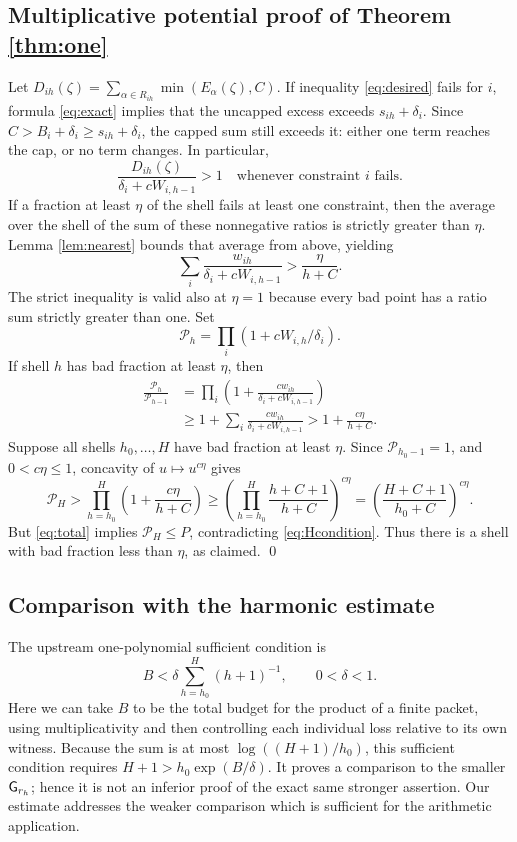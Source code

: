 \documentclass[11pt]{article}
\theoremstyle{remark}\newtheorem{remark}[theorem]{Remark}
\begin{document}
\subsection{Multiplicative potential proof of Theorem \ref{thm:one}}
Let $D_{ih}(\zeta)=\sum_{\alpha\in R_{ih}}\min(E_\alpha(\zeta),C)$.
If inequality \eqref{eq:desired} fails for $i$, formula \eqref{eq:exact}
implies that the uncapped excess exceeds $s_{ih}+\delta_i$. Since
$C>B_i+\delta_i\ge s_{ih}+\delta_i$, the capped sum still exceeds it:
either one term reaches the cap, or no term changes. In particular,
\[
 \frac{D_{ih}(\zeta)}{\delta_i+cW_{i,h-1}}>1
 \quad\text{whenever constraint $i$ fails.}
\]
If a fraction at least $\eta$ of the shell fails at least one constraint,
then the average over the shell of the sum of these nonnegative ratios
is strictly greater than $\eta$. Lemma \ref{lem:nearest} bounds that
average from above, yielding
\begin{equation}\label{eq:bad}
 \sum_i\frac{w_{ih}}{\delta_i+cW_{i,h-1}}>
 \frac{\eta}{h+C}.
\end{equation}
The strict inequality is valid also at $\eta=1$ because every bad
point has a ratio sum strictly greater than one. Set
\[
 \mathcal P_h=\prod_i(1+cW_{i,h}/\delta_i).
\]
If shell $h$ has bad fraction at least $\eta$, then
\begin{align*}
 \frac{\mathcal P_h}{\mathcal P_{h-1}}
 &=\prod_i\left(1+\frac{cw_{ih}}{\delta_i+cW_{i,h-1}}\right)\\
 &\ge1+\sum_i\frac{cw_{ih}}{\delta_i+cW_{i,h-1}}
 >1+\frac{c\eta}{h+C}.
\end{align*}
Suppose all shells $h_0,\ldots,H$ have bad fraction at least $\eta$.
Since $\mathcal P_{h_0-1}=1$, and $0<c\eta\le1$, concavity of
$u\mapsto u^{c\eta}$ gives
\[
 \mathcal P_H>\prod_{h=h_0}^{H}\left(1+\frac{c\eta}{h+C}\right)
 \ge\left(\prod_{h=h_0}^H\frac{h+C+1}{h+C}\right)^{c\eta}
 =\left(\frac{H+C+1}{h_0+C}\right)^{c\eta}.
\]
But \eqref{eq:total} implies $\mathcal P_H\le P$, contradicting
\eqref{eq:Hcondition}. Thus there is a shell with bad fraction less
than $\eta$, as claimed. \qed

\subsection{Comparison with the harmonic estimate}
The upstream one-polynomial sufficient condition is
\[
 B<\delta\sum_{h=h_0}^H(h+1)^{-1},\qquad 0<\delta<1.
\]
Here we can take $B$ to be the total budget for the product of a finite
packet, using multiplicativity and then controlling each individual
loss relative to its own witness. Because the sum is at most
$\log((H+1)/h_0)$, this sufficient condition requires
$H+1>h_0\exp(B/\delta)$. It proves a comparison to the smaller
$\mathsf G_{r_h}$; hence it is not an inferior proof of the exact same
stronger assertion. Our estimate addresses the weaker comparison which
is sufficient for the arithmetic application.
\end{document}
